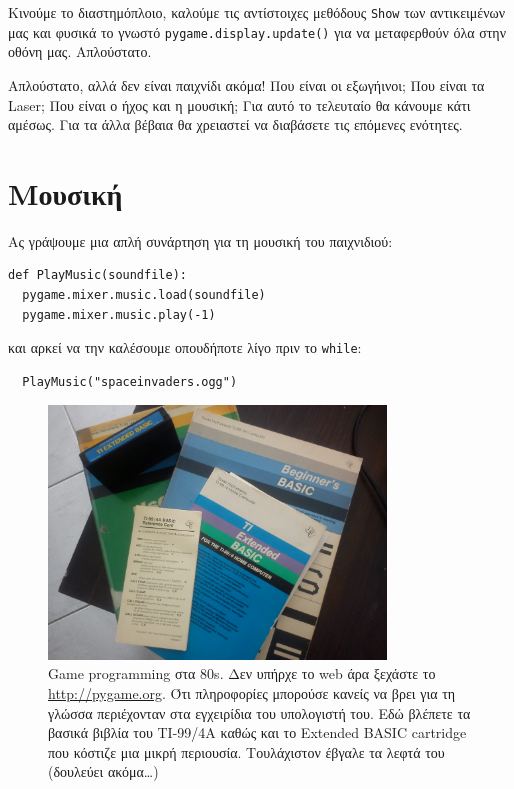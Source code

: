 Κινούμε το διαστημόπλοιο, καλούμε τις αντίστοιχες μεθόδους {\tt Show} των αντικειμένων μας και φυσικά το γνωστό {\tt pygame.display.update()} για να μεταφερθούν όλα στην οθόνη μας. Απλούστατο.

Απλούστατο, αλλά δεν είναι παιχνίδι ακόμα! Που είναι οι εξωγήινοι; Που είναι
τα Laser; Που είναι ο ήχος και η μουσική; Για αυτό το τελευταίο θα κάνουμε
κάτι αμέσως. Για τα άλλα βέβαια θα χρειαστεί να διαβάσετε τις επόμενες
ενότητες.

\section{Μουσική}

Ας γράψουμε μια απλή συνάρτηση για τη μουσική του παιχνιδιού:

\begin{verbatim}
def PlayMusic(soundfile):
  pygame.mixer.music.load(soundfile)
  pygame.mixer.music.play(-1)
\end{verbatim}

και αρκεί να την καλέσουμε οπουδήποτε λίγο πριν το {\tt while}:

\begin{verbatim}
  PlayMusic("spaceinvaders.ogg")
\end{verbatim}

\begin{figure}
\centering
\includegraphics[width=0.8\textwidth]{images/chapter7/biblia}
\caption[Game Programming in the 80s]{Game programming στα 80s. Δεν υπήρχε
το web άρα ξεχάστε το \url{http://pygame.org}. Ότι πληροφορίες μπορούσε κανείς να βρει για τη γλώσσα περιέχονταν στα εγχειρίδια του υπολογιστή του. Εδώ βλέπετε τα βασικά βιβλία του TI-99/4A καθώς και το Extended BASIC cartridge που κόστιζε μια μικρή περιουσία. Τουλάχιστον έβγαλε τα λεφτά του (δουλεύει ακόμα\ldots{})}
\label{7-4}
\end{figure}

